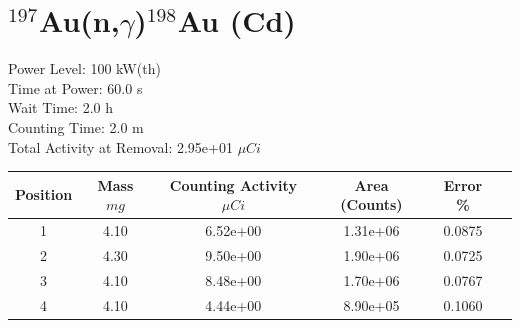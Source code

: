 \newpage

\section*{ $^{197}$Au(n,$\gamma$)$^{198}$Au (Cd) }

Power Level: 100 kW(th) \\
Time at Power: 60.0 s \\
Wait Time:  2.0 h \\
Counting Time:  2.0 m \\
Total Activity at Removal: 2.95e+01 $\mu Ci$

\begin{table}[h]
\centering
\begin{tabular}{ |c|c|c|c|c|c| }
 \hline
 Position & Mass $mg$ & Counting Activity $\mu Ci$ & Area (Counts) & Error \% \\
 \hline 
 1 & 4.10 & 6.52e+00 & 1.31e+06 & 0.0875 \\ 
\hline
 2 & 4.30 & 9.50e+00 & 1.90e+06 & 0.0725 \\ 
\hline
 3 & 4.10 & 8.48e+00 & 1.70e+06 & 0.0767 \\ 
\hline
 4 & 4.10 & 4.44e+00 & 8.90e+05 & 0.1060 \\ 
\hline
\end{tabular}
\end{table}

